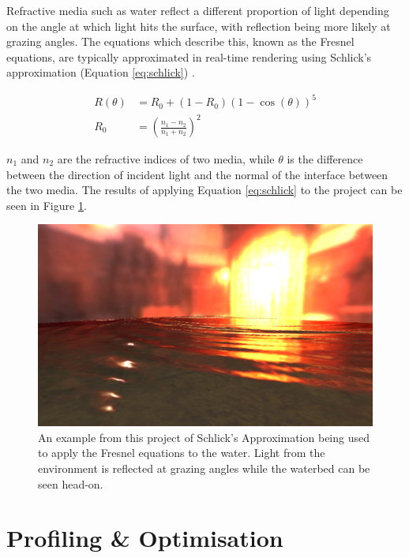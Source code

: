 \documentclass[12pt,a4paper,twoside]{report}
\begin{document}
Refractive media such as water reflect a different proportion of light
depending on the angle at which light hits the surface, with reflection being
more likely at grazing angles. The equations which describe this, known as the
Fresnel equations, are typically approximated in real-time rendering using
Schlick's approximation (Equation \ref{eq:schlick}) \cite{Schlick94}.

\begin{equation} \label{eq:schlick}
\begin{split}
R(\theta) & = R_0 + (1 - R_0)(1 - \cos(\theta))^5 \\
R_0 & = (\frac{n_1 - n_2}{n_1 + n_2})^2
\end{split}
\end{equation}

$n_1$ and $n_2$ are the refractive indices of two media, while $\theta$ is the
difference between the direction of incident light and the normal of the
interface between the two media. The results of applying Equation
\ref{eq:schlick} to the project can be seen in Figure
\ref{fig:wave_particles_fresnel}.

\begin{figure}[h]
\centering
\includegraphics[width=0.8\linewidth]{wave_particles_fresnel}
\caption{An example from this project of Schlick's Approximation being used to
apply the Fresnel equations to the water. Light from the environment is
reflected at grazing angles while the waterbed can be seen head-on.}
\label{fig:wave_particles_fresnel}
\end{figure}

\section{Profiling \& Optimisation}

\end{document}
